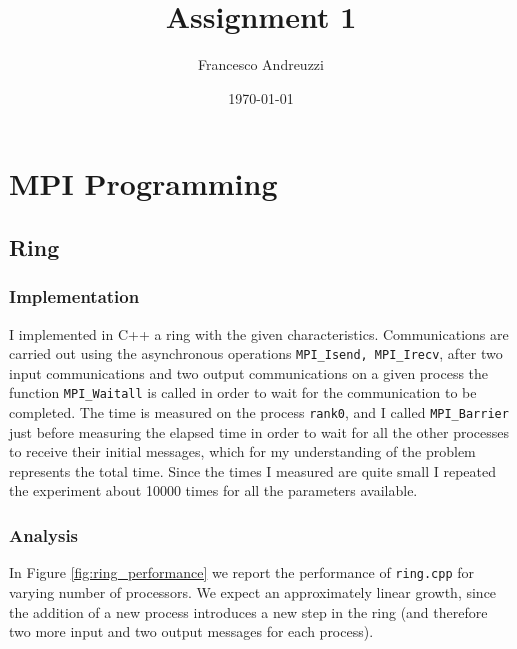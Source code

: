 \documentclass{article}
\title{Assignment 1}
\author{Francesco Andreuzzi}
\date{\today}
\begin{document}
\maketitle

\section{MPI Programming}

\subsection{Ring}

\subsubsection{Implementation}
I implemented in C++ a ring with the given characteristics. Communications are carried out using the asynchronous operations \texttt{MPI\_Isend, MPI\_Irecv}, after two input communications and two output communications on a given process the function \texttt{MPI\_Waitall} is called in order to wait for the communication to be completed. The time is measured on the process \texttt{rank0}, and I called \texttt{MPI\_Barrier} just before measuring the elapsed time in order to wait for all the other processes to receive their initial messages, which for my understanding of the problem represents the total time. Since the times I measured are quite small I repeated the experiment about 10000 times for all the parameters available.

\subsubsection{Analysis}
In Figure \ref{fig:ring_performance} we report the performance of \texttt{ring.cpp} for varying number of processors. We expect an approximately linear growth, since the addition of a new process introduces a new step in the ring (and therefore two more input and two output messages for each process).
\end{document}
